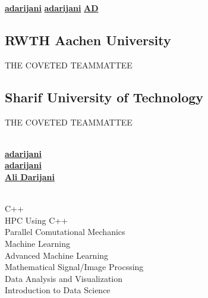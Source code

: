 \documentclass[a4paper]{MagicalCV}
\begin{document}
\lastupdated

  \href{https://github.com/adarijani}{\bf adarijani} 
 \href{https://github.com/adarijani}{\bf adarijani}
 \href{https://www.linkedin.com/in/ali-darijani-675b52241/}{\bf AD}


\begin{minipage}[t]{0.33\textwidth} 


\subsection{RWTH Aachen University}
\vspace{\topsep} %
\begin{tightemize}
\item THE COVETED TEAMMATTEE
\end{tightemize}
\sectionsep

\subsection{Sharif University of Technology}
\begin{tightemize}
\item THE COVETED TEAMMATTEE
\end{tightemize}
\sectionsep

\\
 \href{https://github.com/adarijani}{\bf adarijani} \\
 \href{https://github.com/adarijani}{\bf adarijani} \\
 \href{https://www.linkedin.com/in/ali-darijani-675b52241/}{\bf Ali Darijani}
\sectionsep

\\
C++\\
HPC Using C++\\
Parallel Comutational Mechanics\\
Machine Learning\\
Advanced Machine Learning\\
Mathematical Signal/Image Procssing\\
Data Analysis and Visualization\\
Introduction to Data Science\\




\end{minipage}
\end{document}
